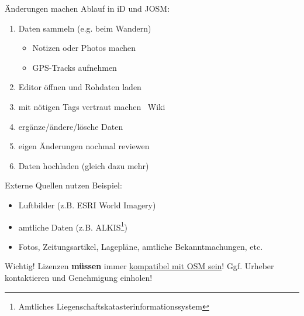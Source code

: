 \documentclass{beamer}
\begin{document}
			\begin{frame}{Änderungen machen}
				Ablauf in iD und JOSM:
				\begin{enumerate}
					\item Daten sammeln (e.g. beim Wandern)
					\begin{itemize}
						\item Notizen oder Photos machen
						\item GPS-Tracks aufnehmen
					\end{itemize}\pause
					\item Editor öffnen und Rohdaten laden\pause
					\item mit nötigen Tags vertraut machen \textrightarrow\ Wiki\pause
					\item ergänze/ändere/lösche Daten\pause
					\item eigen Änderungen nochmal reviewen\pause
					\item Daten hochladen (gleich dazu mehr)
				\end{enumerate}
			\end{frame}
			
			
			\begin{frame}{Externe Quellen nutzen}
				Beispiel:
				\begin{itemize}
					\item Luftbilder (z.B. ESRI World Imagery)
					\item amtliche Daten (z.B. ALKIS\footnote{Amtliches Liegenschaftskatasterinformationssystem})
					\item Fotos, Zeitungsartikel, Lagepläne, amtliche Bekanntmachungen, etc.
				\end{itemize}
				\pause
				\vspace{0.25cm}
				{
					\begin{block}{Wichtig!}
						Lizenzen \textbf{müssen} immer \href{https://wiki.openstreetmap.org/wiki/Import/ODbL_Compatibility}{kompatibel mit OSM sein}! Ggf. Urheber kontaktieren und Genehmigung einholen!
					\end{block}
				}
			\end{frame}
			
\end{document}
